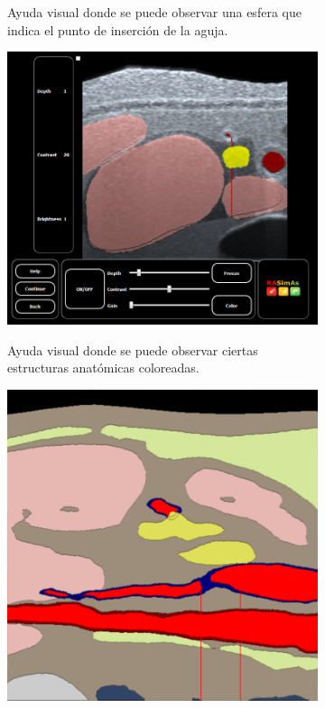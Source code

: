 \begin{figure}[ht]
\begin{subfigure}[b]{0.5\linewidth}
        \caption{Ayuda visual donde se puede observar una esfera que indica el punto de inserción de la aguja.
    \label{fig:viewhelp}}
    \end{subfigure}
    \begin{subfigure}[b]{0.55\linewidth}
        \centering
        {\includegraphics[width=\linewidth]{IMG/labelus.png}}
        \caption{Ayuda visual donde se puede observar ciertas estructuras anatómicas coloreadas.
    \label{fig:labelus}}
    \end{subfigure}
    \null\hfill
     \begin{subfigure}[b]{0.4\linewidth}
        \centering
        {\includegraphics[width=\linewidth]{IMG/labels.png}}

\end{subfigure}
\end{figure}
